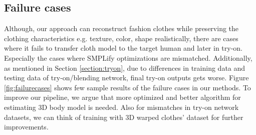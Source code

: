 \subsection{Failure cases}

Although, our approach can reconstruct fashion clothes while preserving the clothing characteristics e.g. texture, color, shape realistically, there are cases where it fails to transfer cloth model to the target human and later in try-on. Especially the cases where SMPLify\cite{Bogo2016SMPLify} optimizations are mismatched. Additionally, as mentioned in Section \ref{section:tryon}, due to differences in training data and testing data of try-on/blending network, final try-on outputs gets worse. Figure \ref{fig:failurecases} shows few sample results of the failure cases in our methods. To improve our pipeline, we argue that more optimized and better algorithm for estimating 3D body model is needed. Also for mismatches in try-on network datasets, we can think of training with 3D warped clothes' dataset for further improvements.



